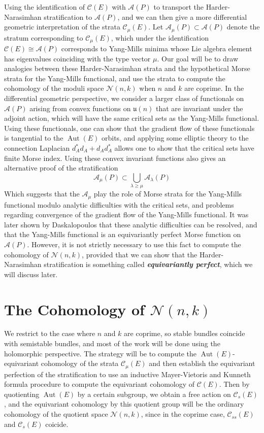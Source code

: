 \documentclass[psamsfonts, 12pt]{amsart}
\theoremstyle{definition}
\theoremstyle{remark}
\newcommand{\ib}[1]{\textbf{\textit{#1}}}
\DeclareMathOperator{\Aut}{Aut}
\begin{document}
Using the identification of $\mathscr{C}(E)$ with $\mathscr{A}(P)$ to
transport the Harder-Narasimhan stratification to $\mathscr{A}(P)$, and we can then
give a more differential geometric interpretation of the strata $\mathscr{C}_\mu(E)$.
Let $\mathscr{A}_\mu(P) \subset \mathscr{A}(P)$ denote the stratum corresponding
to $\mathscr{C}_\mu(E)$, which under the identification
$\mathscr{C}(E) \cong \mathscr{A}(P)$ corresponds to Yang-Mills minima whose Lie
algebra element has eigenvalues coinciding with the type vector $\mu$.
Our goal will be to draw analogies between these Harder-Narasimhan strata and the
hypothetical Morse strata for the Yang-Mills functional, and use the strata to
compute the cohomology of the moduli space $\mathcal{N}(n,k)$ when $n$ and $k$ are
coprime. In the differential geometric perspective, we consider a
larger class of functionals on $\mathscr{A}(P)$ arising from convex
functions on $\mathfrak{u}(n)$ that are invariant under the adjoint action,
which will have the same critical sets as the Yang-Mills functional. Using
these functionals, one can show that the gradient flow of these functionals is
tangential to the $\Aut(E)$ orbits, and applying some elliptic theory to
the connection Laplacian $d_A^*d_A + d_Ad_A^*$ allows one to show that
the critical sets have finite Morse index. Using these convex invariant
functions also gives an alternative proof of the stratification
\[
\mathscr{A}_\mu(P) \subset \bigcup_{\lambda \geq \mu} \mathscr{A}_\lambda(P)
\]
Which suggests that the $\mathscr{A}_\mu$ play the role of Morse strata for the
Yang-Mills functional modulo analytic difficulties with the critical sets, and
problems regarding convergence of the gradient flow of the Yang-Mills functional.
It was later shown by Daskalopoulos \cite{daskalopoulos1992} that these analytic
difficulties can be resolved, and that the Yang-Mills functional is an equivariantly
perfect Morse function on $\mathscr{A}(P)$. However, it is not strictly necessary to
use this fact to compute the cohomology of $\mathcal{N}(n,k)$, provided that we can
show that the Harder-Narasimhan stratification is something called
\ib{equivariantly perfect}, which we will discuss later.
%
\section{The Cohomology of $\mathcal{N}(n,k)$}
%
We restrict to the case where $n$ and $k$ are coprime, so stable bundles coincide
with semistable bundles, and most of the work will be done using the holomorphic
perspective. The strategy will be to compute the $\Aut(E)$-equivariant
cohomology of the strata $\mathscr{C}_\mu(E)$ and then establish the
equivariant perfection of the stratification to use an inductive Mayer-Vietoris
and Kunneth formula procedure to compute the equivariant cohomology of
$\mathscr{C}(E)$. Then by quotienting $\Aut(E)$ by a certain subgroup, we obtain
a free action on $\mathscr{C}_s(E)$, and the equivariant cohomology by this
quotient group will be the ordinary cohomology of the quotient space
$\mathcal{N}(n,k)$, since in the coprime case, $\mathscr{C}_{ss}(E)$ and
$\mathscr{C}_s(E)$ coicide. \\
\end{document}
